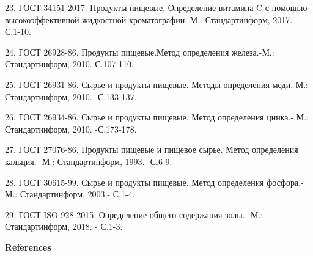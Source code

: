 \begin{references}
23. ГОСТ 34151-2017. Продукты пищевые. Определение витамина C с помощью
высокоэффективной жидкостной хроматографии.-М.: Стандартинформ, 2017.-
С.1-10.

24. ГОСТ 26928-86. Продукты пищевые.Метод определения железа.-М.:
Стандартинформ, 2010.-С.107-110.

25. ГОСТ 26931-86. Сырье и продукты пищевые. Методы определения меди.-М.:
Стандартинформ, 2010.- С.133-137.

26. ГОСТ 26934-86. Сырье и продукты пищевые. Метод определения цинка.-
М.: Стандартинформ, 2010. -С.173-178.

27. ГОСТ 27076-86. Продукты пищевые и пищевое сырье. Метод определения
кальция. -М.: Стандартинформ, 1993.- С.6-9.

28. ГОСТ 30615-99. Сырье и продукты пищевые. Метод определения
фосфора.-М.: Стандартинформ, 2003.- С.1-4.

29. ГОСТ ISO 928-2015. Определение общего содержания золы.- М.:
Стандартинформ, 2018. - С.1-3.
\end{references}

\begin{center}
{\bfseries References}
\end{center}

